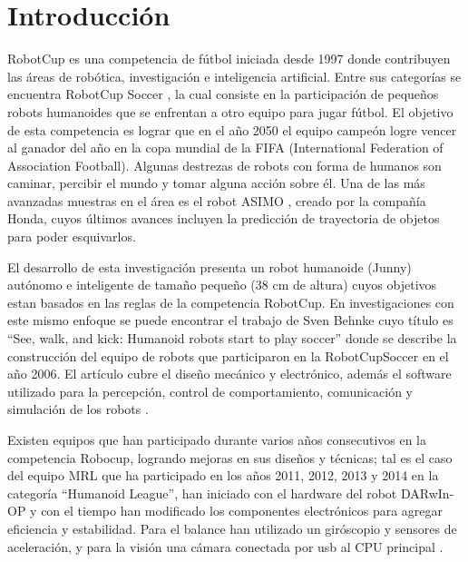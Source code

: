 
\chapter{Introducción}\label{intro}


\label{sect:justificacion}


RobotCup \cite{robotcup} es una competencia de fútbol iniciada desde 1997 donde contribuyen las áreas de robótica, investigación e inteligencia artificial. Entre sus categorías se encuentra RobotCup Soccer \cite{robotcupsoccer}, la cual consiste en la participación de pequeños robots humanoides que se enfrentan a otro equipo para jugar fútbol. El objetivo de esta competencia es lograr que en el año 2050 el equipo campeón logre vencer al ganador del año en la copa mundial de la FIFA (International Federation of Association Football). Algunas destrezas de robots con forma de humanos  son caminar, percibir el mundo y tomar alguna acción sobre él. Una de las más avanzadas muestras en el área es el robot ASIMO \cite{asimo}, creado por la compañía Honda, cuyos últimos avances incluyen la predicción de trayectoria de objetos para poder esquivarlos.

El desarrollo de esta investigaci\'on presenta un robot humanoide (Junny) aut\'onomo e inteligente de tamaño pequeño (38 cm de altura) cuyos objetivos estan basados en las reglas de la competencia RobotCup. En investigaciones con este mismo enfoque se puede encontrar el trabajo de Sven Behnke cuyo título es “See, walk, and kick: Humanoid robots start to play soccer” donde se describe la construcción del equipo de robots que participaron en la RobotCupSoccer en el a\~no 2006. El artículo cubre el diseño mecánico y electrónico, además el software utilizado para la percepción, control de comportamiento, comunicación y simulación de los robots \cite{paper}.

Existen equipos que han participado durante varios años consecutivos en la competencia Robocup, logrando mejoras en sus diseños y técnicas; tal es el caso del equipo MRL que ha participado en los años 2011, 2012, 2013 y 2014 en la categoría “Humanoid League”, han iniciado con el hardware del robot DARwIn-OP y con el tiempo han modificado los componentes electrónicos para agregar eficiencia y estabilidad. Para el balance han utilizado un giróscopio y sensores de aceleración, y para la visión una cámara conectada por usb al CPU principal \cite{paper1}.

